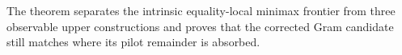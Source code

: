 The theorem separates the intrinsic equality-local minimax frontier from three observable upper constructions and proves that the corrected Gram candidate still matches where its pilot remainder is absorbed.